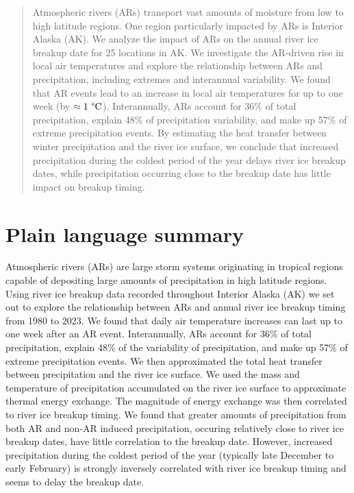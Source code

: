 \documentclass[12pts,draft]{AR_analysis_}
\begin{document}
\begin{abstract}
	
	Atmospheric rivers (ARs) transport vast amounts of moisture 
	from low to high latitude regions. One region particularly 
	impacted by ARs is Interior Alaska (AK). We analyze the impact 
	of ARs on the annual river ice breakup date for 25 locations 
	in AK. We investigate the AR-driven rise in local air temperatures 
	and explore the relationship between ARs and precipitation, 
	including extremes and interannual variability. We found that 
	AR events lead to an increase in local air temperatures
	for up to one week (by $\mathrm{\approx 1~\degree C}$). 
	Interannually, ARs account 
	for 36\% of total precipitation, explain 48\% of precipitation 
	variability, and make up 57\% of extreme precipitation events. 
	By estimating the heat transfer between winter precipitation
	and the river ice surface, we 
	conclude that increased precipitation during the 
	coldest period of the year delays river ice breakup dates, 
	while precipitation occurring close to the breakup date has little 
	impact on breakup timing.

\end{abstract}


\section*{Plain language summary}

	Atmospheric rivers (ARs) are large storm systems originating in
	tropical regions capable of depositing large amounts of
	precipitation in high latitude regions. 
	Using river ice breakup data recorded throughout Interior
	Alaska (AK) we set out to explore the relationship between
	ARs and annual river ice breakup timing from 1980 to 2023. 
	We found that 
	daily air temperature increases can last up to
	one week after an AR event. Interannually, ARs
	account for 36\% of total precipitation, 
	explain 48\% of the variability of precipitation, and make up 57\% 
	of extreme precipitation events. We then
	approximated the total heat transfer between precipitation 
	and the river ice surface. We used the mass and temperature 
	of precipitation accumulated on the river ice surface to approximate 
	thermal energy exchange. The magnitude of energy exchange was then
	correlated to river ice breakup timing. We found that greater 
	amounts of precipitation from both AR and non-AR induced precipitation,
	occuring relatively close to
	river ice breakup dates, have little correlation to the breakup
	date. However, increased precipitation
	during the coldest period of the
	year (typically late December to early February) is strongly inversely
	correlated with river ice breakup timing and seems to delay
	the breakup date.
\end{document}
